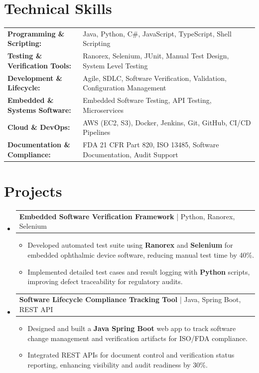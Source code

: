 \documentclass[letterpaper,10pt]{article}
\makeatletter
\newcommand{\resumeItem}[1]{
  \item{\fontsize{8pt}{9pt}\selectfont
    #1 \vspace{-3pt}
  }
}
\newcommand{\resumeProjectHeading}[2]{
    \item
    \begin{tabular*}{1.001\textwidth}{l@{\extracolsep{\fill}}r}
      \fontsize{8.5pt}{10pt}#1 & \textbf{\fontsize{8.5pt}{10pt} #2}\\
    \end{tabular*}\vspace{-7pt}
}
\newcommand{\resumeSubHeadingListStart}{\begin{itemize}[leftmargin=0pt, label={}]}
\newcommand{\resumeSubHeadingListEnd}{\end{itemize}}
\newcommand{\resumeItemListStart}{\begin{itemize}[leftmargin=*]}
\newcommand{\resumeItemListEnd}{\end{itemize}\vspace{-5pt}}
\makeatother
\begin{document}
\section{Technical Skills}
        \vspace{-14pt}
        \begin{table}[h]
            \fontsize{8pt}{9pt}\selectfont
            \begin{tabular}{p{0.3\linewidth} p{0.7\linewidth}}
                \textbf{Programming \& Scripting:} & Java, Python, C\#, JavaScript, TypeScript, Shell Scripting \\
                \textbf{Testing \& Verification Tools:} & Ranorex, Selenium, JUnit, Manual Test Design, System Level Testing \\
                \textbf{Development \& Lifecycle:} & Agile, SDLC, Software Verification, Validation, Configuration Management \\
                \textbf{Embedded \& Systems Software:} & Embedded Software Testing, API Testing, Microservices \\
                \textbf{Cloud \& DevOps:} & AWS (EC2, S3), Docker, Jenkins, Git, GitHub, CI/CD Pipelines \\
                \textbf{Documentation \& Compliance:} & FDA 21 CFR Part 820, ISO 13485, Software Documentation, Audit Support \\
            \end{tabular}
        \end{table}
 \vspace{-18pt}

\section{Projects}
    \vspace{-5pt}
    \resumeSubHeadingListStart
          \resumeProjectHeading
            {\textbf{Embedded Software Verification Framework} | Python, Ranorex, Selenium}
            {}
            \resumeItemListStart
                \resumeItem{Developed automated test suite using \textbf{Ranorex} and \textbf{Selenium} for embedded ophthalmic device software, reducing manual test time by 40\%.}
                \resumeItem{Implemented detailed test cases and result logging with \textbf{Python} scripts, improving defect traceability for regulatory audits.}
            \resumeItemListEnd
        \vspace{-12pt}
        \resumeProjectHeading
            {\textbf{Software Lifecycle Compliance Tracking Tool} | Java, Spring Boot, REST API}
            {}
            \resumeItemListStart
                \resumeItem{Designed and built a \textbf{Java Spring Boot} web app to track software change management and verification artifacts for ISO/FDA compliance.}
                \resumeItem{Integrated REST APIs for document control and verification status reporting, enhancing visibility and audit readiness by 30\%.}
            \resumeItemListEnd
    \resumeSubHeadingListEnd
\end{document}
